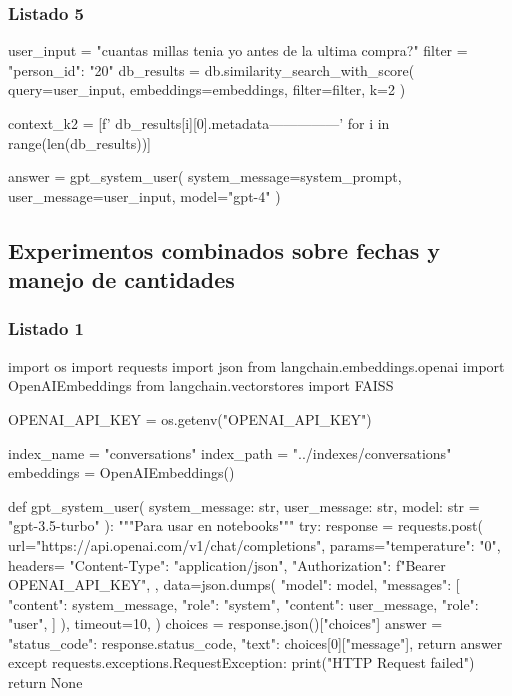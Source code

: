 \subsubsection{Listado 5}
\label{anexo:code-4-1-13-5}

\begin{APACode}
user_input = "cuantas millas tenia yo antes de la ultima compra?"
filter = {"person_id": "20"}
db_results = db.similarity_search_with_score(
    query=user_input, 
    embeddings=embeddings, 
    filter=filter, 
    k=2
)

context_k2 = [f' {db_results[i][0].metadata}\n---------------\n\n' 
              for i in range(len(db_results))]

answer = gpt_system_user(
    system_message=system_prompt, 
    user_message=user_input, 
    model="gpt-4"
)
\end{APACode}

\subsection{Experimentos combinados sobre fechas y manejo de cantidades}

\subsubsection{Listado 1}
\label{anexo:code-4-1-14-1}

\begin{APACode}
import os
import requests
import json
from langchain.embeddings.openai import OpenAIEmbeddings
from langchain.vectorstores import FAISS

OPENAI_API_KEY = os.getenv("OPENAI_API_KEY")

index_name = "conversations"
index_path = "../indexes/conversations"
embeddings = OpenAIEmbeddings()

def gpt_system_user(
    system_message: str, user_message: str, model: str = "gpt-3.5-turbo"
):
    """Para usar en notebooks"""
    try:
        response = requests.post(
            url="https://api.openai.com/v1/chat/completions",
            params={"temperature": "0"},
            headers={
                "Content-Type": "application/json",
                "Authorization": f"Bearer {OPENAI_API_KEY}",
            },
            data=json.dumps({
                "model": model,
                "messages": [
                    {"content": system_message, "role": "system"},
                    {"content": user_message, "role": "user"},
                ]
            }),
            timeout=10,
        )
        choices = response.json()["choices"]
        answer = {
            "status_code": response.status_code,
            "text": choices[0]["message"],
        }
        return answer
    except requests.exceptions.RequestException:
        print("HTTP Request failed")
        return None
\end{APACode}

